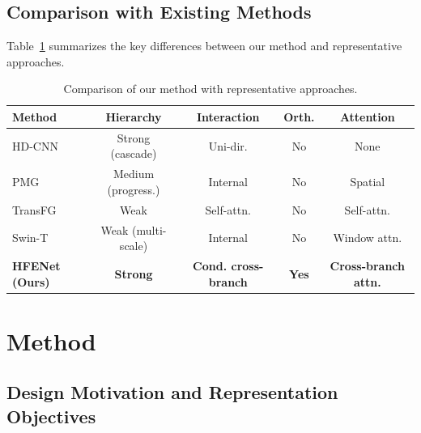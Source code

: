 \documentclass[pdflatex,sn-mathphys-num]{sn-jnl}
\theoremstyle{thmstyleone}%
\theoremstyle{thmstyletwo}%
\theoremstyle{thmstylethree}%
\begin{document}
\subsection{Comparison with Existing Methods}
Table~\ref{tab:method_comparison} summarizes the key differences between our method and representative approaches.
\begin{table}[htbp]
    \centering
    \caption{Comparison of our method with representative approaches.}
    \label{tab:method_comparison}
    \setlength{\tabcolsep}{4pt}
    \renewcommand{\arraystretch}{1.1}
    \small
    \begin{tabular}{@{}lcccc@{}}
    \toprule
    \textbf{Method} & \textbf{Hierarchy} & \textbf{Interaction} & \textbf{Orth.} & \textbf{Attention} \\
    \midrule
    HD-CNN \cite{yan2015hdcnn}   & Strong (cascade)   & Uni-dir.     & No  & None \\
    PMG \cite{du2020fine}        & Medium (progress.) & Internal     & No  & Spatial \\
    TransFG \cite{he2021transfg} & Weak               & Self-attn.   & No  & Self-attn. \\
    Swin-T \cite{liu2021swin}    & Weak (multi-scale) & Internal     & No  & Window attn. \\
    \midrule
    \textbf{HFENet (Ours)}       & \textbf{Strong}    & \textbf{Cond. cross-branch} & \textbf{Yes} & \textbf{Cross-branch attn.} \\
    \bottomrule
    \end{tabular}
\end{table}
\section{Method}
\label{sec:method}

\subsection{Design Motivation and Representation Objectives}
\end{document}
